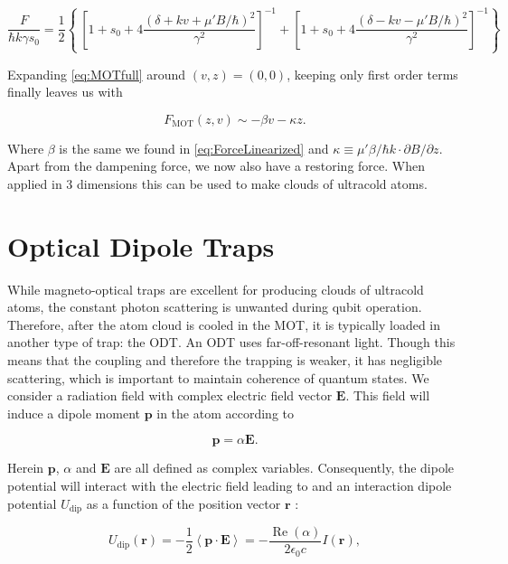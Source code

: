 \begin{equation}\label{eq:MOTfull}
	\frac{F}{\hbar k \gamma s_0} = \frac{1}{2}\left\{\
	\left[1 + s_0 + 4\frac{(\delta+kv+\mu'B/\hbar)^2}{\gamma^2}\right]^{-1}+
	\left[1 + s_0 + 4\frac{(\delta-kv-\mu'B/\hbar)^2}{\gamma^2}\right]^{-1}
	\right\}
\end{equation}

Expanding \cref{eq:MOTfull} around $(v,z) = (0,0)$, keeping only first order terms finally leaves us with \cite{Kowalski2010}

\begin{equation}\label{eq:ForceMOT}
	F_{\text{MOT}}(z,v) \sim -\beta v - \kappa z.
\end{equation}

Where $\beta$ is the same we found in \cref{eq:ForceLinearized} and $\kappa \equiv \mu' \beta /\hbar k \cdot \partial B/\partial z$. 
Apart from the dampening force, we now also have a restoring force. 
When applied in 3 dimensions this can be used to make clouds of ultracold atoms. 

\section{Optical Dipole Traps}\label{sec:OpticalDipoleTrap}

While magneto-optical traps are excellent for producing clouds of ultracold atoms, the constant photon scattering is unwanted during qubit operation. 
Therefore, after the atom cloud is cooled in the \ac{MOT}, it is typically loaded in another type of trap: the \ac{ODT}. 
An ODT uses far-off-resonant light. Though this means that the coupling and therefore the trapping is weaker, it has negligible scattering, which is important to maintain coherence of quantum states. 
We consider a radiation field with complex electric field vector $\mathbf{E}$. 
This field will induce a dipole moment $\mathbf{p}$ in the atom according to 
	
\begin{equation}\label{eq:DipoleMoment}
	\mathbf{p} = \alpha \mathbf{E}.
\end{equation}

Herein $\mathbf{p}$, $\alpha$ and $\mathbf{E}$ are all defined as complex variables. Consequently, the dipole potential will interact with the electric field leading to and an interaction dipole potential $U_{\text{dip}}$ as a function of the position vector $\mathbf{r}$ \cite{Grimm2000}:

\begin{equation}\label{eq:DipolePotential}
	U_{\text{dip}}(\mathbf{r}) = 
	-\frac{1}{2} \left\langle \mathbf{p}\cdot\mathbf{E} \right\rangle=
	- \frac{\operatorname{Re}(\alpha)}{2\epsilon_0 c} I(\mathbf{r}),
\end{equation}

